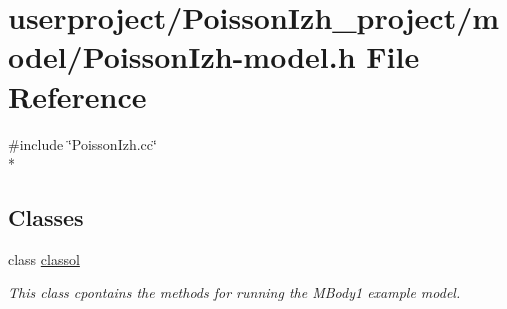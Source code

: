 \hypertarget{PoissonIzh-model_8h}{\section{userproject/\+Poisson\+Izh\+\_\+project/model/\+Poisson\+Izh-\/model.h File Reference}
\label{PoissonIzh-model_8h}
}
{\ttfamily \#include \char`\"{}Poisson\+Izh.\+cc\char`\"{}}\\*
\subsection*{Classes}
\begin{DoxyCompactItemize}
\item 
class \hyperlink{classclassol}{classol}
\begin{DoxyCompactList}\small\item\em This class cpontains the methods for running the M\+Body1 example model. \end{DoxyCompactList}\end{DoxyCompactItemize}
